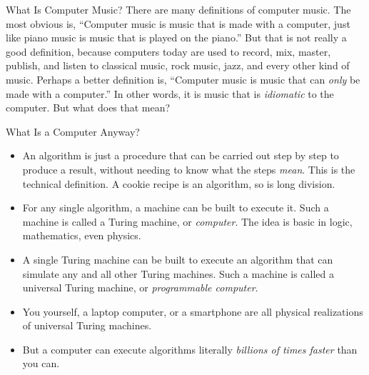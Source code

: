 \documentclass{beamer}
\begin{document}
\begin{frame}{What Is Computer Music?}
	There are many definitions of computer music.
	The most obvious is, ``Computer music is music that is made with a computer, just like piano music is music that is played on the piano.'' But that is not really a good definition, because computers today are used to record, mix, master, publish, and listen to classical music, rock music, jazz, and every other kind of music. Perhaps a better definition is, ``Computer music is music that can \emph{only} be made with a computer.'' In other words, it is music that is \emph{idiomatic} to the computer. But what does that mean?
\end{frame}

\begin{frame}{What Is a Computer Anyway?}
	\begin{itemize}
		\item
			An algorithm is just a procedure that can be carried out step by step to produce a result, without needing to know what the steps \emph{mean}. This is the technical definition. A cookie recipe is an algorithm, so is long division.
		\item
			For any single algorithm, a machine can be built to execute it. Such a machine is called a Turing machine, or \textit{computer}. The idea is basic in logic, mathematics, even physics.
		\item
			A single Turing machine can be built to execute an algorithm that can simulate any and all other Turing machines. Such a machine is called a universal Turing machine, or \textit{programmable computer}.
		\item
			You yourself, a laptop computer, or a smartphone are all physical realizations of universal Turing machines.
		\item
			But a computer can execute algorithms literally \emph{billions of times faster} than you can.
	\end{itemize}
\end{frame}
\end{document}
